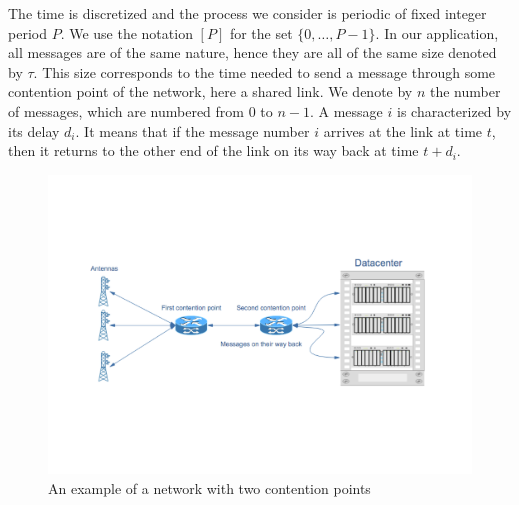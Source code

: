 \documentclass[10pt, conference, letterpaper]{IEEEtran}
\begin{document}
The time is discretized and the process we consider is periodic of fixed integer period $P$. We use the notation $[P]$ for the set $\{0,\dots,P-1\}$. In our application, all messages are of the same nature, hence they are all of the same size denoted by $\tau$. This size corresponds to the time needed to send a message through some contention point of the network, here a shared link. We denote by $n$ the number of messages, which are numbered from $0$ to $n-1$. A message $i$ is characterized by its delay $d_i$. It means that if the message number $i$ arrives at the link at time $t$, then it returns to the other end of the link on its way back at time $t + d_i$. 
\begin{center}
\begin{figure}
\centering
\includegraphics[scale=0.35]{network.pdf}
\centering
{}
\caption{An example of a network with two contention points}
\end{figure}
\end{center}
\end{document}
